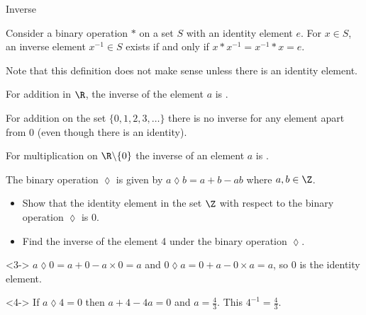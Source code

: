 \documentclass[8pt]{beamer}
\begin{document}
\begin{frame}[shrink=5]{Inverse}
	\begin{definition}
		Consider a binary operation $*$ on a set  $S$ with an identity element  $e$. For  $x\in S$, an inverse element  $x^{-1}\in S$ exists if and only if $x*x^{-1}=x^{-1}*x=e$.
	\end{definition}

	\alert<1>{Note that this definition does not make sense unless there is an identity element.}

	For addition in $\R$, the inverse of the element $a$ is .

	For addition on the set $\{0,1,2,3,\ldots\}$ there is no inverse for any element apart from 0 (even though there is an identity).

	For multiplication on $\R \backslash \{0\}$ the inverse of an element $a$ is .

	\begin{problem}
		The binary operation $\lozenge$ is given by  $a\lozenge b = a+b-ab$ where  $a,b\in \Z$.
		\begin{itemize}
			\item Show that the identity element in the set $\Z$ with respect to the binary operation $\lozenge$ is 0.
			\item Find the inverse of the element 4 under the binary operation  $\lozenge$.
		\end{itemize}

	\end{problem}
	\begin{solution}<3->
		$a\lozenge 0 = a+0 -a \times 0=a $ and $0\lozenge a=0+a-0\times a=a$, so 0 is the identity element.
	\end{solution}
	\begin{solution}<4->
		If $a\lozenge 4=0$ then $a+4-4a=0$ and  $a=\frac{4}{3}$. This $4^{-1}=\frac{4}{3}$. 
	\end{solution}
	
\end{frame}
\end{document}
